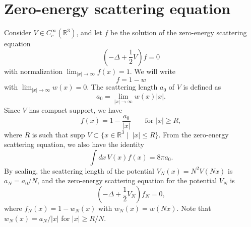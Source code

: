 \documentclass[11pt,a4paper]{scrartcl} %
\newcommand{\R}{\mathds{R}}
\begin{document}
\section{Zero-energy scattering equation}


Consider $V \in C_c^\infty(\R^3)$, and let $f$ be the solution of the
zero-energy scattering equation
\[
  \left( -\Delta + \frac{1}{2} V \right) f = 0
\]
with normalization $\lim_{|x|\to\infty} f(x) = 1$. We will write
\[
  f = 1 - w
\]
with $\lim_{|x|\to\infty} w(x) = 0$. The scattering length $a_0$ of $V$ is
defined as
\[
  a_0 = \lim_{|x| \to \infty} w(x)|x|.
\]
Since $V$ has compact support, we have
\[
  f(x) = 1 - \frac{a_0}{|x|} \qquad \text{for } |x| \ge R,
\]
where $R$ is such that $\text{supp }V \subset \{ x \in \R^3 \; | \;\; |x| \le
R \}$. From the zero-energy scattering equation, we also have the identity
\[
  \int dx \, V(x) f(x) = 8 \pi a_0.
\]
By scaling, the scattering length of the potential $V_N(x) = N^2 V(Nx)$ is
$a_N = a_0/N$, and the zero-energy scattering equation for the potential $V_N$
is
\begin{equation}
  \label{eq:scatteringequation}
  \left( -\Delta + \frac{1}{2} V_N \right) f_N = 0,
\end{equation}
where $f_N(x) = 1 - w_N(x)$ with $w_N(x) = w(Nx)$. Note that $w_N(x) =
a_N/|x|$ for $|x| \ge R/N$.
\end{document}
